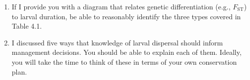 \documentclass[letterpaper]{tufte-handout}
\begin{document}
\begin{enumerate}
	\item If I provide you with a diagram that relates genetic differentiation (e.g., $F_\mathrm{ST}$) to larval duration, be able to reasonably identify the three types covered in Table 4.1.
	
	\item I discussed five ways that knowledge of larval dispersal should inform management decisions. You should be able to explain each of them. Ideally, you will take the time to think of these in terms of your own conservation plan.
	
\end{enumerate}
\end{document}
